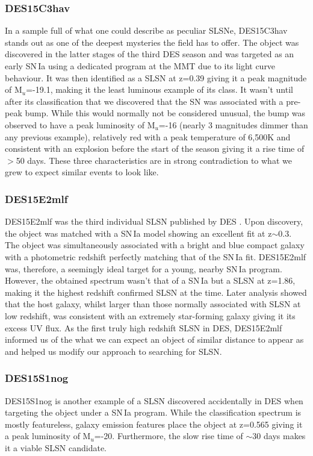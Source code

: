 \subsubsection{DES15C3hav}
In a sample full of what one could describe as peculiar SLSNe, DES15C3hav stands out as one of the deepest mysteries the field has to offer. The object was discovered in the latter stages of the third DES season and was targeted as an early SN\,Ia using a dedicated program at the MMT due to its light curve behaviour. It was then identified as a SLSN at z=0.39 giving it a peak magnitude of M$_u$=-19.1, making it the least luminous example of its class. It wasn't until after its classification that we discovered that the SN was associated with a pre-peak bump. While this would normally not be considered unusual, the bump was observed to have a peak luminosity of M$_u$=-16 (nearly 3 magnitudes dimmer than any previous example), relatively red with a peak temperature of 6,500K and consistent with an explosion before the start of the season giving it a rise time of $>$50 days. These three characteristics are in strong contradiction to what we grew to expect similar events to look like.

\subsubsection{DES15E2mlf}
DES15E2mlf was the third individual SLSN published by DES \citep{Pan2017}. Upon discovery, the object was matched with a SN\,Ia model showing an excellent fit at z$\sim$0.3. The object was simultaneously associated with a bright and blue compact galaxy with a photometric redshift perfectly matching that of the SN\,Ia fit. DES15E2mlf was, therefore, a seemingly ideal target for a young, nearby SN\,Ia program. However, the obtained spectrum wasn't that of a SN\,Ia but a SLSN at z=1.86, making it the highest redshift confirmed SLSN at the time. Later analysis showed that the host galaxy, whilst larger than those normally associated with SLSN at low redshift, was consistent with an extremely star-forming galaxy giving it its excess UV flux. As the first truly high redshift SLSN in DES, DES15E2mlf informed us of the what we can expect an object of similar distance to appear as and helped us modify our approach to searching for SLSN.

\subsubsection{DES15S1nog}
DES15S1nog is another example of a SLSN discovered accidentally in DES when targeting the object under a SN\,Ia program. While the classification spectrum is mostly featureless, galaxy emission features place the object at z=0.565 giving it a peak luminosity of M$_u$=-20. Furthermore, the slow rise time of $\sim$30 days makes it a viable SLSN candidate.

